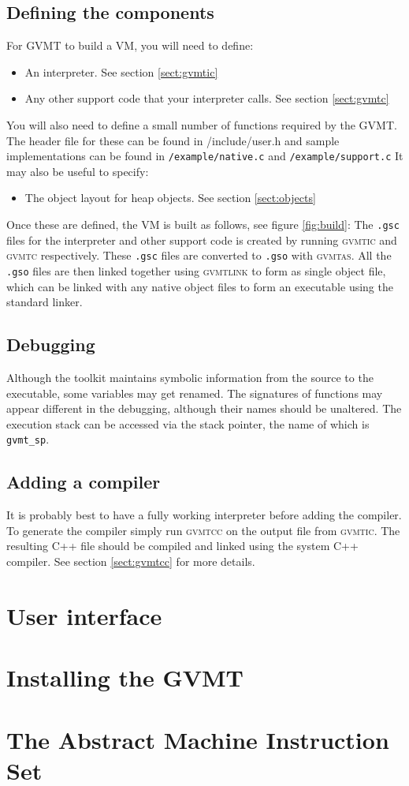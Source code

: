 \documentclass[a4paper,12pt]{report}
\newcommand{\gvmtic}{\textsc{gvmtic}}
\newcommand{\gvmtc}{\textsc{gvmtc}}
\newcommand{\glink}{\textsc{gvmtlink}}
\newcommand{\gvmtas}{\textsc{gvmtas}}
\newcommand{\gvmtcc}{\textsc{gvmtcc}}
\begin{document}
\section{Defining the components}
For GVMT to build a VM, you will need to define:
\begin{itemize}
\item An interpreter. See section \ref{sect:gvmtic}
\item Any other support code that your interpreter calls. See section \ref{sect:gvmtc}
\end{itemize}
You will also need to define a small number of functions required by the GVMT. The header file for these can be found in /include/user.h and sample implementations can be found in \verb|/example/native.c| and \verb|/example/support.c|
It may also be useful to specify:
\begin{itemize}
\item The object layout for heap objects. See section \ref{sect:objects}
\end{itemize}

Once these are defined, the VM is built as follows, see figure \ref{fig:build}: The \verb|.gsc| files for the interpreter and other support code is created by running \gvmtic{} and \gvmtc{} respectively. These  \verb|.gsc| files are converted to \verb|.gso| with \gvmtas. All the  \verb|.gso| files are then linked together using \glink{} to form as single object file, which can be linked with any native object files to form an executable using the standard linker.

\section{Debugging}
Although the toolkit maintains symbolic information from the source to the executable, some variables may get renamed. 
The signatures of functions may appear different in the debugging, although their names should be unaltered.
The execution stack can be accessed via the stack pointer, the name of which is \verb|gvmt_sp|.

\section{Adding a compiler}
It is probably best to have a fully working interpreter before adding the compiler. To generate the compiler simply run \gvmtcc{} on the output file from \gvmtic. The resulting C++ file should be compiled and linked using the system C++ compiler. See section \ref{sect:gvmtcc} for more details.

\chapter{User interface}


\appendix

\chapter{Installing the GVMT}



\chapter{The Abstract Machine Instruction Set\label{app:inst}}
\small


\end{document}
